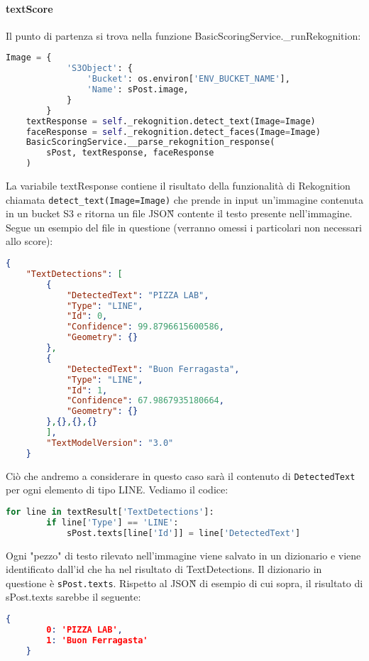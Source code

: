 \paragraph{textScore}
Il punto di partenza si trova nella funzione BasicScoringService.\_runRekognition:
\begin{lstlisting}[language=Python]
    Image = {
            'S3Object': {
                'Bucket': os.environ['ENV_BUCKET_NAME'],
                'Name': sPost.image,
            }
        }
    textResponse = self._rekognition.detect_text(Image=Image)
    faceResponse = self._rekognition.detect_faces(Image=Image)
    BasicScoringService.__parse_rekognition_response(
        sPost, textResponse, faceResponse
    )
\end{lstlisting}
La variabile textResponse contiene il risultato della funzionalità
di Rekognition chiamata \verb+detect_text(Image=Image)+ che prende in input un'immagine contenuta
in un bucket S3 e ritorna un file JSON\G{} contente il testo presente nell'immagine.
Segue un esempio del file in questione (verranno omessi i particolari non necessari allo score):
\begin{lstlisting}[language=JSON]
    {
    "TextDetections": [
        {
            "DetectedText": "PIZZA LAB",
            "Type": "LINE",
            "Id": 0,
            "Confidence": 99.8796615600586,
            "Geometry": {}
        },
        {
            "DetectedText": "Buon Ferragasta",
            "Type": "LINE",
            "Id": 1,
            "Confidence": 67.9867935180664,
            "Geometry": {}
        },{},{},{}
        ],
        "TextModelVersion": "3.0"
    }        
\end{lstlisting}
Ciò che andremo a considerare in questo caso sarà il contenuto di \verb+DetectedText+
per ogni elemento di tipo LINE. 
Vediamo il codice: 
\begin{lstlisting}[language=Python]
    for line in textResult['TextDetections']:
        if line['Type'] == 'LINE':
            sPost.texts[line['Id']] = line['DetectedText']
\end{lstlisting}
Ogni "pezzo" di testo rilevato nell'immagine viene salvato in un dizionario e viene
identificato dall'id che ha nel risultato di TextDetections. Il dizionario in
questione è \verb+sPost.texts+.
Rispetto al JSON\G{} di esempio di cui sopra, il risultato di sPost.texts sarebbe il seguente:
\begin{lstlisting}[language=JSON]
    {
        0: 'PIZZA LAB', 
        1: 'Buon Ferragasta'
    }
\end{lstlisting}
